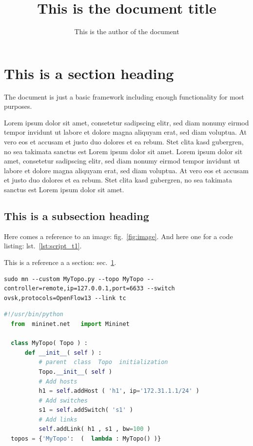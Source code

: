 \documentclass[a4paper]{article}
\title{This is the document title}
\author{This is the author of the document}
\begin{document}
\maketitle
\section{This is a section heading}
\label{sec:sectionheading}

The document is just a basic framework including enough functionality for most purposes.\newline

Lorem ipsum dolor sit amet, consetetur sadipscing elitr, sed diam nonumy eirmod tempor invidunt ut labore et dolore magna aliquyam erat, sed diam voluptua. At vero eos et accusam et justo duo dolores et ea rebum. Stet clita kasd gubergren, no sea takimata sanctus est Lorem ipsum dolor sit amet. Lorem ipsum dolor sit amet, consetetur sadipscing elitr, sed diam nonumy eirmod tempor invidunt ut labore et dolore magna aliquyam erat, sed diam voluptua. At vero eos et accusam et justo duo dolores et ea rebum. Stet clita kasd gubergren, no sea takimata sanctus est Lorem ipsum dolor sit amet.
\newline

\subsection{This is a subsection heading}
\label{subsec:subsectionheading}

Here comes a reference to an image: fig.\ \ref{fig:image}. And here one for a code listing: lst.\ \ref{lst:script_t1}.
\newline

This is a reference a a section: sec.\ \ref{sec:sectionheading}.\newline

\begin{lstlisting}[style=myshell, caption={This is a sample listing for shell commands.}, label={lst:mn_setup1},captionpos=b]
sudo mn --custom MyTopo.py --topo MyTopo --controller=remote,ip=127.0.0.1,port=6633 --switch ovsk,protocols=OpenFlow13 --link tc
\end{lstlisting}

\begin{lstlisting}[language=Python, caption={Note that the shown code does not necessarily make sense ;-). Shows listing in Python.},label={lst:script_t1},captionpos=b]
  #!/usr/bin/python
  from  mininet.net   import Mininet

  class MyTopo( Topo ) :
      def __init__( self ) :
          # parent  class  Topo  initialization
          Topo.__init__( self )
          # Add hosts
          h1 = self.addHost ( 'h1', ip='172.31.1.1/24' )
          # Add switches
          s1 = self.addSwitch( 's1' )
          # Add links
          self.addLink( h1 , s1 , bw=100 )      
  topos = {'MyTopo':  (  lambda : MyTopo() )}

\end{lstlisting}
\end{document}
